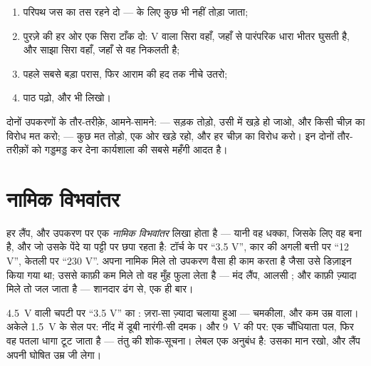 \begin{method}[विभवांतर मापना]\label{met:g8:voltage-voltmeter:measure}
\begin{enumerate}
  \item परिपथ जस का तस रहने दो ---  के लिए कुछ भी नहीं
        तोड़ा जाता;
  \item पुरज़े की हर ओर एक सिरा टाँक दो: \unit{V} वाला सिरा वहाँ,
        जहाँ से पारंपरिक धारा भीतर घुसती है, और साझा सिरा वहाँ, जहाँ
        से वह निकलती है;
  \item पहले सबसे बड़ा परास, फिर आराम की हद तक नीचे उतरो;
  \item पाठ पढ़ो, और  भी लिखो।
\end{enumerate}
दोनों उपकरणों के तौर-तरीक़े, आमने-सामने:  --- सड़क तोड़ो, उसी में
खड़े हो जाओ, और किसी चीज़ का विरोध मत करो;  --- कुछ मत तोड़ो,
एक ओर खड़े रहो, और हर चीज़ का विरोध करो। इन दोनों तौर-तरीक़ों को गड्डमड्ड
कर देना कार्यशाला की सबसे महँगी आदत है।
\end{method}

\section{नामिक विभवांतर}

\begin{definition}[नामिक विभवांतर]\label{def:g8:voltage-voltmeter:nominal}
हर लैंप,  और उपकरण पर एक \emph{नामिक विभवांतर} लिखा होता है --- यानी वह धक्का, जिसके लिए वह बना है, और जो
उसके पेंदे या पट्टी पर छपा रहता है: टॉर्च के  पर ``3.5 V'', कार
की अगली बत्ती पर ``12 V'', केतली पर ``230 V''. अपना नामिक 
मिले तो उपकरण वैसा ही काम करता है जैसा उसे डिज़ाइन किया गया था; उससे
काफ़ी कम मिले तो वह मुँह फुला लेता है --- मंद लैंप, आलसी ; और
काफ़ी ज़्यादा मिले तो जल जाता है --- शानदार ढंग से, एक ही बार।
\end{definition}

\begin{example}[लैंप और बैटरी का मेल]\label{ex:g8:voltage-voltmeter:matching}
\qty{4.5}{V} वाली चपटी  पर ``3.5 V'' का : ज़रा-सा ज़्यादा
चलाया हुआ --- चमकीला, और कम उम्र वाला। अकेले \qty{1.5}{V} के सेल पर:
नींद में डूबी नारंगी-सी दमक। और \qty{9}{V} की  पर: एक चौंधियाता
पल, फिर वह पतला धागा टूट जाता है --- तंतु की शोक-सूचना। लेबल एक
अनुबंध है: उसका मान रखो, और लैंप अपनी घोषित उम्र जी लेगा।
\end{example}

